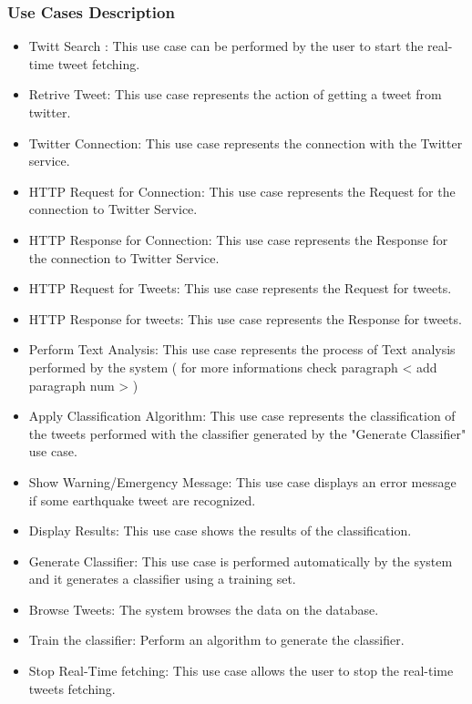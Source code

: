 \documentclass[a4paper, oneside]{article}
\begin{document}
\subsubsection{Use Cases Description}
\begin{itemize}
\item Twitt Search : This use case can be performed by the user to start the real-time tweet fetching.
\item Retrive Tweet: This use case represents the action of getting a tweet from twitter.
\item Twitter Connection: This use case represents the connection with the Twitter service.
\item HTTP Request for Connection: This use case represents the Request for the connection to Twitter Service.
\item HTTP Response for Connection: This use case represents the Response for the connection to Twitter Service.
\item HTTP Request for Tweets: This use case represents the Request for tweets.
\item HTTP Response for tweets: This use case represents the Response for tweets.
\item Perform Text Analysis: This use case represents the process of Text analysis performed by the system ( for more informations check paragraph < add paragraph num > )
\item Apply Classification Algorithm: This use case represents the classification of the tweets performed with the classifier generated by the "Generate Classifier" use case.
\item Show Warning/Emergency Message: This use case displays an error message if some earthquake tweet are recognized.
\item Display Results: This use case shows the results of the classification.
\item Generate Classifier: This use case is performed automatically by the system and it generates a classifier using a training set. 
\item Browse Tweets: The system browses the data on the database.
\item Train the classifier: Perform an algorithm to generate the classifier.
\item Stop Real-Time fetching: This use case allows the user to stop the real-time tweets fetching.
\end{itemize}
\end{document}
